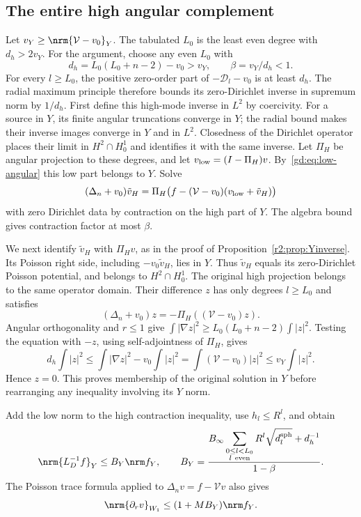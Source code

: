 \subsection{The entire high angular complement}\label{gd:sec:high}
Let $v_Y\ge\nrm{\mathcal V-v_0}_Y$.
The tabulated $L_0$ is the least even degree with $d_h>2v_Y$.
For the argument, choose any even $L_0$ with
\begin{equation}\label{gd:eq:high}
 d_h=L_0(L_0+n-2)-v_0>v_Y,\qquad \beta=v_Y/d_h<1 .
\end{equation}
For every $l\ge L_0$, the positive zero-order part of $-\mathcal D_l-v_0$
is at least $d_h$. The radial maximum principle therefore bounds its
zero-Dirichlet inverse in supremum norm by $1/d_h$.
First define this high-mode inverse in $L^2$ by coercivity.
For a source in $Y$, its finite angular truncations converge in $Y$;
the radial bound makes their inverse images converge in $Y$ and in
$L^2$. Closedness of the Dirichlet operator places their limit in
$H^2\cap H^1_0$ and identifies it with the same inverse.
Let $\Pi_H$ be angular projection to these degrees, and let
$v_{\rm low}=(I-\Pi_H)v$. By~\eqref{gd:eq:low-angular} this low part
belongs to $Y$. Solve
\[
 (\Delta_n+v_0)\tilde v_H
   =\Pi_H\bigl(f-(\mathcal V-v_0)(v_{\rm low}+\tilde v_H)\bigr)
\]
with zero Dirichlet data by contraction on the high part of $Y$.
The algebra bound gives contraction factor at most $\beta$.

We next identify $\tilde v_H$ with $\Pi_Hv$, as in the proof of
Proposition~\ref{r2:prop:Yinverse}.
Its Poisson right side, including $-v_0\tilde v_H$, lies in $Y$.
Thus $\tilde v_H$ equals its zero-Dirichlet Poisson potential, and belongs
to $H^2\cap H^1_0$. The original high projection belongs to the same
operator domain. Their difference $z$ has only degrees $l\ge L_0$ and
satisfies
\[
 (\Delta_n+v_0)z=-\Pi_H((\mathcal V-v_0)z).
\]
Angular orthogonality and $r\le1$ give
$\int|\nabla z|^2\ge L_0(L_0+n-2)\int|z|^2$.
Testing the equation with $-z$, using self-adjointness of $\Pi_H$,
gives
\[
 d_h\int|z|^2
 \le\int|\nabla z|^2-v_0\int|z|^2
 =\int(\mathcal V-v_0)|z|^2\le v_Y\int|z|^2 .
\]
Hence $z=0$. This proves membership of the original solution in $Y$
before rearranging any inequality involving its $Y$ norm.

Add the low norm to the high contraction inequality, use $h_l\le R^l$,
and obtain
\begin{equation}\label{gd:eq:BY}
 \nrm{L_D^{-1}f}_Y\le B_Y\nrm f_Y,\qquad
 B_Y=\frac{B_\infty
       \displaystyle\sum_{\substack{0\le l<L_0\\l\ {\rm even}}}
                R^l\sqrt{d_l^{\rm sph}}+d_h^{-1}}{1-\beta}.
\end{equation}
The Poisson trace formula applied to $\Delta_n v=f-\mathcal Vv$
also gives
\begin{equation}\label{gd:eq:trace-conjugated}
 \nrm{\partial_rv}_{W_1}\le(1+MB_Y)\nrm f_Y .
\end{equation}

